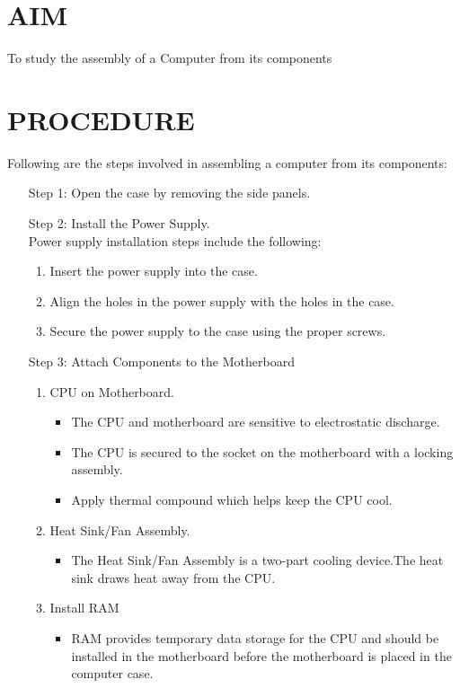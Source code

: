 

\section*{AIM}
To study the assembly of a Computer from its components 
\section*{PROCEDURE}
Following are the steps involved in assembling a computer from its components:


\begin{enumerate}
	\item [Step] 1: Open the case by removing the side panels.
	\item [Step] 2: Install the Power Supply.\\
	\hspace*{5mm}Power supply installation steps include the following:
	\begin{enumerate}
		\item Insert the power supply into the case.
		\item Align the holes in the power supply with the holes in the case.
		\item Secure the power supply to the case using the proper screws.
	\end{enumerate}
	\item [Step] 3: Attach Components to the Motherboard
	\begin{enumerate}
		\item CPU on Motherboard.
			\begin{itemize}
				\item The CPU and motherboard are sensitive to electrostatic discharge.
				\item The CPU is secured to the socket on the motherboard with a locking assembly.
				\item Apply thermal compound which helps keep the CPU cool.
			\end{itemize}
		\item Heat Sink/Fan Assembly.
			\begin{itemize}
				\item The Heat Sink/Fan Assembly is a two-part cooling device.The heat sink draws heat away from the CPU.
			\end{itemize}
		\item Install RAM
			\begin{itemize}
				\item RAM provides temporary data storage for the CPU and should be installed in the motherboard before the motherboard is placed in the computer case.

\end{itemize}
\end{enumerate}
\end{enumerate}
